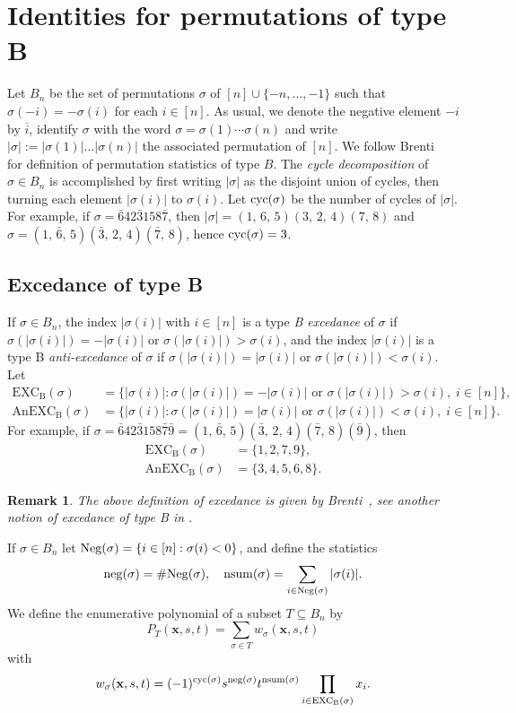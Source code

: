 \documentclass[12pt,reqno]{amsart}
\numberwithin{equation}{section}
\newcommand\cyc{\mathop{ \rm cyc}}
\newcounter{num}
\def\x{\mathbf{ x}}
\def\cyc{\mathop{\rm cyc}}
\def\neg{\mathop{\rm neg}}
\def\nsum{\mathop{\rm nsum}}
\newtheorem{rem}{Remark}
\begin{document}
\section{Identities  for permutations of type B}\label{type B}
Let $B_n$ be the set of permutations $\sigma$ of $[n]\cup 
\{-n,\ldots, -1\}$ such that $\sigma(-i)=-\sigma(i)$ for each $i\in [n]$. 
As usual, we denote the negative element $-i$ by $\overline{i}$, 
identify $\sigma$ with the word $\sigma=\sigma(1)\cdots\sigma(n)$ and 
write $|\sigma|:=|\sigma(1)|\ldots |\sigma(n)|$ the associated permutation of $[n]$.  We follow  Brenti~\cite{Br94} for definition of  permutation statistics of  type $B$.
The \emph{cycle decomposition} of $\sigma\in B_n$ is accomplished by first writing $|\sigma|$ as the disjoint union of cycles,
then turning each element $|\sigma(i)|$ to $\sigma(i)$.
Let $\cyc(\sigma)$ be the number of cycles of $|\sigma|$. 
For example, if $\sigma=\bar{6}42\bar{3}158\bar{7}$, then 
$|\sigma|=(1,\,{6},\,5)({3},\,2,\,4)({7},\,8)$ and 
 $\sigma=(1,\,\bar{6},\,5)(\bar{3},\,2,\,4)(\bar{7},\,8)$, hence $\cyc(\sigma)=3$. 


\subsection{Excedance of type B}
If $\sigma\in B_n$, 
 the index 
$|\sigma(i)|$ with  $i\in [n]$ is a type \emph{B excedance} of $\sigma$
if $\sigma(|\sigma(i)|)=-|\sigma(i)|$ or $\sigma(|\sigma(i)|)>\sigma(i)$, and
the index $|\sigma(i)|$ is a type B \emph{anti-excedance} of $\sigma$
if $\sigma(|\sigma(i)|)=|\sigma(i)|$ or $ \sigma(|\sigma(i)|)<\sigma(i) $. Let
\begin{align*}
	\mathrm{EXC_B}(\sigma)&=\{|\sigma(i)|: \sigma(|\sigma(i)|)=-|\sigma(i)| \text{ or } \sigma(|\sigma(i)|)>\sigma(i), \; i\in [n]\},\\
	\mathrm{AnEXC_B}(\sigma)&=\{|\sigma(i)|:
	\sigma(|\sigma(i)|)=|\sigma(i)| \text{ or }
	\sigma(|\sigma(i)|)<\sigma(i), \; i\in [n]\}.
\end{align*}
For example, if $\sigma=\bar{6}42\bar{3}158\bar{7}\bar{9}=(1,\,\bar{6},\,5)(\bar{3},\,2,\,4)(\bar{7},\,8)(\bar 9)$, 
then 
\begin{align*}
\mathrm{EXC_B}(\sigma)&=\{1,2,7,9\},\\
\mathrm{AnEXC_B}(\sigma)&=\{3,4,5,6,8\}.
\end{align*}
\begin{rem} 
The above definition of excedance  is given by Brenti~\cite{Br94}, see another notion of excedance of type B in \cite{St94}.
\end{rem}
If $\sigma\in B_n$ 
let
${\rm Neg}(\sigma)=\{i\in [n] : \sigma(i)<0 \}$, and define the statistics
$$\neg(\sigma)=\#{\rm Neg}(\sigma), \quad
\nsum(\sigma)=\sum_{i\in {\rm Neg}(\sigma)}|\sigma(i)|.$$
We define the enumerative polynomial of a subset $T\subseteq B_n$ by
$$P_{T}(\x,s, t)=\sum_{\sigma\in T}w_{\sigma}(\x,s,t)
$$
with 
$$w_{\sigma}(\x,s, t)=(-1)^{\cyc(\sigma)}s^{\neg(\sigma)}t^{{\rm nsum}(\sigma)}\prod_{i\in\mathrm{EXC_B(\sigma)}}x_i.$$
\end{document}
